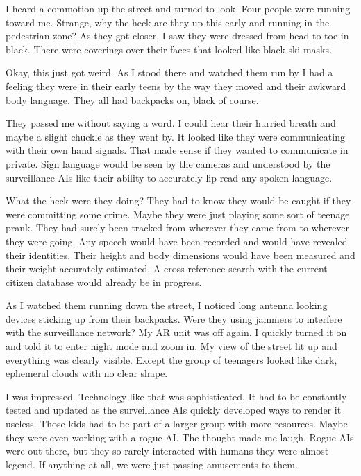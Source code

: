 \subsectsep

I heard a commotion up the street and turned to look. Four
people were running toward me. Strange, why the heck are they up
this early and running in the pedestrian zone? As they got
closer, I saw they were dressed from head to toe in black.
There were coverings over their faces that looked like black ski
masks.

Okay, this just got weird. As I stood there and watched them run
by I had a feeling they were in their early teens by the way
they moved and their awkward body language. They all had
backpacks on, black of course.

They passed me without saying a word. I could hear their hurried
breath and maybe a slight chuckle as they went by. It looked
like they were communicating with their own hand signals. That
made sense if they wanted to communicate in private.  Sign
language would be seen by the cameras and understood by the
surveillance AIs like their ability to accurately lip-read any
spoken language.

What the heck were they doing? They had to know they would be
caught if they were committing some crime. Maybe they were just
playing some sort of teenage prank.  They had surely been
tracked from wherever they came from to wherever they were
going. Any speech would have been recorded and would have
revealed their identities.  Their height and body dimensions
would have been measured and their weight accurately estimated.
A cross-reference search with the current citizen database would
already be in progress.

As I watched them running down the street, I noticed long
antenna looking devices sticking up from their backpacks. Were
they using jammers to interfere with the surveillance network?
My AR unit was off again. I quickly turned it on and told it to
enter night mode and zoom in.  My view of the street lit up and
everything was clearly visible.  Except the group of teenagers
looked like dark, ephemeral clouds with no clear shape.

I was impressed.  Technology like that was sophisticated. It had
to be constantly tested and updated as the surveillance AIs
quickly developed ways to render it useless. Those kids had to
be part of a larger group with more resources. Maybe they were
even working with a rogue AI.  The thought made me laugh. Rogue
AIs were out there, but they so rarely interacted with humans
they were almost legend. If anything at all, we were just
passing amusements to them.

